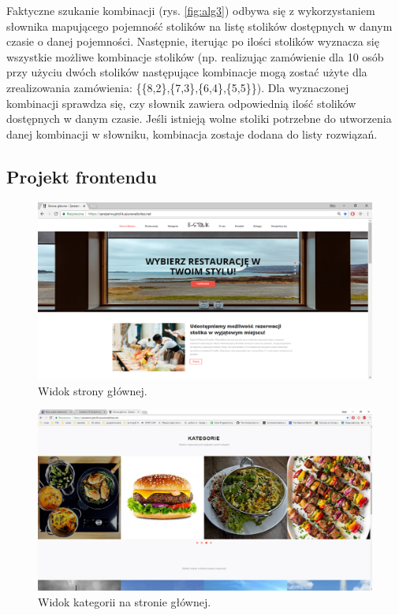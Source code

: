 \documentclass{article}
\begin{document}
Faktyczne szukanie kombinacji (rys. \ref{fig:alg3}) odbywa się z wykorzystaniem słownika mapującego pojemność stolików na listę stolików dostępnych w danym czasie o danej pojemności. Następnie, iterując po ilości stolików wyznacza się wszystkie możliwe kombinacje stolików (np. realizując zamówienie dla 10 osób przy użyciu dwóch stolików następujące kombinacje mogą zostać użyte dla zrealizowania zamówienia: \{\{8,2\},\{7,3\},\{6,4\},\{5,5\}\}). Dla wyznaczonej kombinacji sprawdza się, czy słownik zawiera odpowiednią ilość stolików dostępnych w danym czasie. Jeśli istnieją wolne stoliki potrzebne do utworzenia danej kombinacji w słowniku, kombinacja zostaje dodana do listy rozwiązań.


\subsection{Projekt frontendu}

\begin{figure}[H]
\centering
	\includegraphics[width=1.00\textwidth]{screens/index1.png}
	\caption{Widok strony głównej.}
	\label{fig:index}
\end{figure}

\begin{figure}[H]
\centering
	\includegraphics[width=1.00\textwidth]{screens/index2.png}
	\caption{Widok kategorii na stronie głównej.}
	\label{fig:index_category}
\end{figure}
\end{document}
